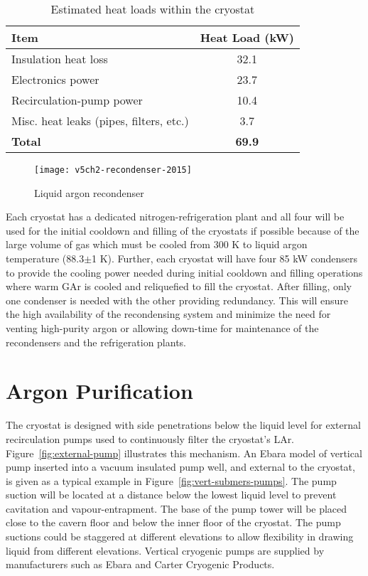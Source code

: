 \begin{table}
\centering
\caption{Estimated heat loads within the cryostat}
\label{table:cryo-heat-loads}
\begin{tabular}[htbp]{|l|c|}
\hline
{\bf Item} & {\bf Heat Load (kW)}\\
\hline\hline
Insulation heat loss & 32.1  \\
\hline
Electronics power & 23.7  \\
\hline
Recirculation-pump power & 10.4 \\
\hline
Misc. heat leaks (pipes, filters, etc.) & 3.7 \\
\hline\hline
{\bf Total} & {\bf 69.9 } \\
\hline
\end{tabular} 
\end{table}

\begin{figure}[htbp]
\centering
\texttt{[image: v5ch2-recondenser-2015]}
\caption{Liquid argon recondenser}
\label{fig:v5ch2-recondenser-sept-2011}
\end{figure}

Each cryostat has a dedicated nitrogen-refrigeration plant 
and all four will be used for the initial cooldown and filling of the 
cryostats if possible because of the large volume of 
gas which must be cooled from 300 K to liquid
argon temperature (88.3$\pm$1 K). Further, each cryostat will
have four 85 kW condensers to 
provide the cooling power needed during initial 
cooldown and filling operations where warm GAr
is cooled and reliquefied to fill the cryostat.
After filling, only one condenser is needed with the
other providing redundancy.
This will ensure the high availability of the recondensing 
system and minimize the need for venting high-purity argon 
or allowing down-time for maintenance of
the recondensers and the refrigeration plants. 

\section{Argon Purification}
\label{subsec:argon-pur}
The cryostat is designed with side penetrations below the liquid level 
for external recirculation pumps used to continuously filter the cryostat's 
LAr. Figure~\ref{fig:external-pump} illustrates this mechanism. An Ebara 
model of vertical pump inserted into a vacuum insulated pump well, and 
external to the cryostat, is given 
as a typical example in Figure~\ref{fig:vert-submers-pumps}. The pump suction 
will be located at a distance below the lowest liquid level  
to prevent cavitation and vapour-entrapment. The base of the pump
tower will be placed close to the cavern floor and below the inner
floor of the cryostat. The pump suctions
could be staggered at different elevations to allow flexibility 
in drawing liquid from different 
elevations. Vertical cryogenic pumps are supplied by manufacturers 
such as Ebara and Carter Cryogenic Products. 

